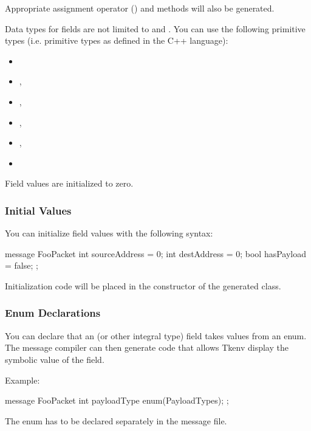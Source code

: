 Appropriate assignment operator () and  methods will
also be generated.

Data types for fields are not limited to  and
. You can use the following primitive types (i.e. primitive
types as defined in the C++ language):

\begin{itemize}
   \item {}
   \item {}, 
   \item {}, 
   \item {}, 
   \item {}, 
   \item {}
\end{itemize}

Field values are initialized to zero.


\subsubsection{Initial Values}

You can initialize field values with the following syntax:

\begin{msg}
message FooPacket
{
    int sourceAddress = 0;
    int destAddress = 0;
    bool hasPayload = false;
};
\end{msg}

Initialization code will be placed in the constructor of the generated class.


\subsubsection{Enum Declarations}

You can declare that an  (or other integral type) field
takes values from an enum. The message compiler can then generate code
that allows Tkenv display the symbolic value of the field.

Example:

\begin{msg}
message FooPacket
{
    int payloadType enum(PayloadTypes);
};
\end{msg}

The enum has to be declared separately in the message file.


